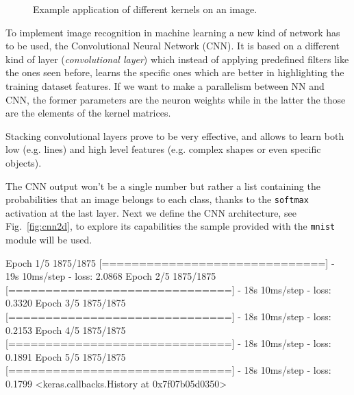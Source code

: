 \begin{figure}[!p]
{	}\quad
{}
\caption{Example application of different kernels on an image.}
\end{figure} 

To implement image recognition in machine learning a new kind of network has to be used, the Convolutional Neural Network (CNN). It is based on a different kind of layer (\emph{convolutional layer}) which instead of applying predefined filters like the ones seen before, learns the specific ones which are better in highlighting the training dataset features. If we want to make a parallelism between NN and CNN, the former parameters are the neuron weights while in the latter the those are the elements of the kernel matrices.

Stacking convolutional layers prove to be very effective, and allows to learn both low (e.g. lines) and high level features (e.g. complex shapes or even specific objects).

The CNN output won't be a single number but rather a list containing the probabilities that an image belongs to each class, thanks to the \texttt{softmax} activation at the last layer. 
Next we define the CNN architecture, see Fig.~\ref{fig:cnn2d}, to explore its capabilities the sample provided with the \texttt{mnist} module will be used.

\begin{ioutput}
Epoch 1/5
1875/1875 [==============================] - 19s 10ms/step - loss: 2.0868
Epoch 2/5
1875/1875 [==============================] - 18s 10ms/step - loss: 0.3320
Epoch 3/5
1875/1875 [==============================] - 18s 10ms/step - loss: 0.2153
Epoch 4/5
1875/1875 [==============================] - 18s 10ms/step - loss: 0.1891
Epoch 5/5
1875/1875 [==============================] - 18s 10ms/step - loss: 0.1799
<keras.callbacks.History at 0x7f07b05d0350>
\end{ioutput}

